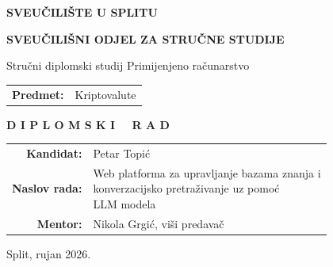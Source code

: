 \begin{titlepage}
    \begin{center}
        \Large \textbf{SVEUČILIŠTE U SPLITU}\
 
        \large \textbf{SVEUČILIŠNI ODJEL ZA STRUČNE STUDIJE}\
 
        \normalsize Stručni diplomski studij Primijenjeno računarstvo
      
        \vspace{2cm}
      
        \large
        \begin{flushleft}
            \hspace*{1.8cm}
            \begin{tabular}{rl}
                \textbf{Predmet:} & \hspace{-0.6em} Kriptovalute
            \end{tabular}
        \end{flushleft}
      
        \vspace{1cm}
      
        \LARGE \textbf{D I P L O M S K I \ \  R A D}
 
      \vspace{2cm}
      
        \large
        \begin{flushleft}
            \hspace*{1cm}
            \begin{tabular}{r@{\hspace{0.5em}}l}
                \textbf{Kandidat:} & Petar Topić \\[0.5em]
                \textbf{Naslov rada:} & \parbox[t]{10.5cm}{Web platforma za upravljanje bazama znanja i\\konverzacijsko pretraživanje uz pomoć\\LLM modela\\[-1em]\strut} \\
                \textbf{Mentor:} & Nikola Grgić, viši predavač
            \end{tabular}
        \end{flushleft}
 
        \vfill
      
        \normalsize Split, rujan 2026.
    \end{center}
 \end{titlepage}
 
